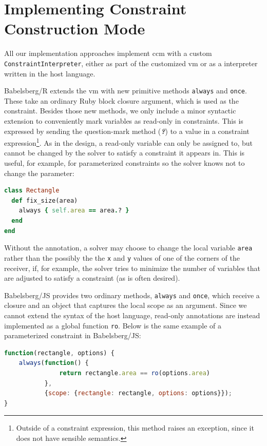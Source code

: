 \section{Implementing Constraint Construction Mode}

All our implementation approaches implement \ac{ccm} with a custom
\lstinline{ConstraintInterpreter}, either as part of the customized \ac{vm} or
as a interpreter written in the host language.

Babelsberg/R extends the \ac{vm} with new primitive methods \lstinline{always}
and \lstinline{once}. These take an ordinary Ruby block closure argument, which
is used as the constraint. Besides those new methods, we only include a minor
syntactic extension to conveniently mark variables as read-only in constraints.
This is expressed by sending the question-mark method ({\bfseries\emph{?}}) to a
value in a constraint expression\footnote{Outside of a constraint expression,
  this method raises an exception, since it does not have sensible semantics.}.
As in the design, a read-only variable can only be assigned to, but cannot be
changed by the solver to satisfy a constraint it appears in. This is useful, for
example, for parameterized constraints so the solver knows not to change the
parameter:
\begin{lstlisting}[language=ruby]
class Rectangle
  def fix_size(area)
    always { self.area == area.? }
  end
end
\end{lstlisting}
Without the annotation, a solver may choose to change the local variable
\lstinline{area} rather than the possibly the the \lstinline{x} and
\lstinline{y} values of one of the corners of the receiver, if, for example, the
solver tries to minimize the number of variables that are adjusted to satisfy a
constraint (as is often desired).

Babelsberg/JS provides two ordinary methods, \lstinline{always} and
\lstinline{once}, which receive a \javascript closure and an object that
captures the local scope as an argument. Since we cannot extend the syntax of
the host language, read-only annotations are instead implemented as a global
function \lstinline{ro}. Below is the same example of a parameterized constraint
in Babelsberg/JS:
\begin{lstlisting}[language=JavaScript]
function(rectangle, options) {
    always(function() {
               return rectangle.area == ro(options.area)
           },
           {scope: {rectangle: rectangle, options: options}});
}
\end{lstlisting}

